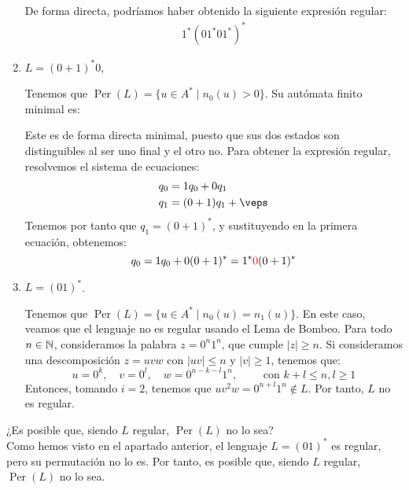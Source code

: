 \begin{ejercicio}
\begin{enumerate}
        De forma directa, podríamos haber obtenido la siguiente expresión regular:
        \begin{align*}
            1^*(01^*01^*)^*
        \end{align*}
        \item $L = (0 + 1)^*0$,
        
        Tenemos que $\operatorname{Per}(L) = \{u\in A^*\mid n_0(u)>0\}$.
        Su autómata finito minimal es:
        \begin{figure}[H]
            \centering
        \end{figure}
        Este es de forma directa minimal, puesto que sus dos estados son distinguibles al ser uno final y el otro no. Para obtener la expresión regular, resolvemos el sistema de ecuaciones:
        \begin{align*}
            q_0 &= 1q_0+0q_1\\
            q_1 &= (0+1)q_1 + \veps
        \end{align*}
        Tenemos por tanto que $q_1=(0+1)^*$, y sustituyendo en la primera ecuación, obtenemos:
        \begin{equation*}
            q_0 = 1q_0 + 0(0+1)^* = 1^*{\color{red}0}(0+1)^*
        \end{equation*}

        \item $L = (01)^*$.
        
        Tenemos que $\operatorname{Per}(L) = \{u\in A^*\mid n_0(u)=n_1(u)\}$.
        En este caso, veamos que el lenguaje no es regular usando el Lema de Bombeo. Para todo $n\in \mathbb{N}$, consideramos la palabra $z=0^n1^n$, que cumple $|z|\geq n$. Si consideramos una descomposición $z=uvw$ con $|uv|\leq n$ y $|v|\geq 1$, tenemos que:
        \begin{equation*}
            u=0^k,\quad v=0^l,\quad w=0^{n-k-l}1^n, \qquad \text{\ con\ } k+l\leq n, l\geq 1
        \end{equation*}
        Entonces, tomando $i=2$, tenemos que $uv^2w=0^{n+l}1^n\notin L$. Por tanto, $L$ no es regular.
    \end{enumerate}
    ¿Es posible que, siendo $L$ regular, $\operatorname{Per}(L)$ no lo sea?\\

    Como hemos visto en el apartado anterior, el lenguaje $L=(01)^*$ es regular, pero su permutación no lo es. Por tanto, es posible que, siendo $L$ regular, $\operatorname{Per}(L)$ no lo sea.
\end{ejercicio}

